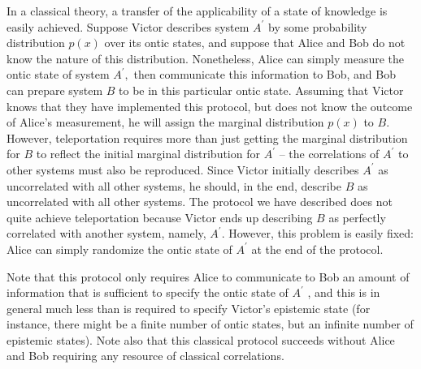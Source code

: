 \documentclass[pra,nofootinbib,showpacs,12pt]{revtex4}
\begin{document}
In a classical theory, a transfer of the applicability of a state of
knowledge is easily achieved. Suppose Victor describes system $A^{\prime }$
by some probability distribution $p(x)$ over its ontic states, and suppose
that Alice and Bob do not know the nature of this distribution. Nonetheless,
Alice can simply measure the ontic state of system $A^{\prime },$ then
communicate this information to Bob, and Bob can prepare system $B$ to be in
this particular ontic state. Assuming that Victor knows that they have
implemented this protocol, but does not know the outcome of Alice's
measurement, he will assign the marginal distribution $p(x)$ to $B.$
However, teleportation requires more than just getting the marginal
distribution for $B$ to reflect the initial marginal distribution for $%
A^{\prime }$ -- the correlations of $A^{\prime }$ to other systems must also
be reproduced. Since Victor initially describes $A^{\prime }$ as
uncorrelated with all other systems, he should, in the end, describe $B$ as
uncorrelated with all other systems. The protocol we have described does not
quite achieve teleportation because Victor ends up describing $B$ as
perfectly correlated with another system, namely, $A^{\prime }$. However,
this problem is easily fixed: Alice can simply randomize the ontic state of $%
A^{\prime }$ at the end of the protocol.

Note that this protocol only requires Alice to communicate to Bob an amount
of information that is sufficient to specify the ontic state of $A^{\prime }$%
, and this is in general much less than is required to specify Victor's
epistemic state (for instance, there might be a finite number of ontic
states, but an infinite number of epistemic states). Note also that this
classical protocol succeeds without Alice and Bob requiring any resource of
classical correlations.
\end{document}
